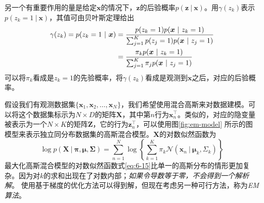 \documentclass[11pt]{ctexbook}
\begin{document}
另一个有重要作用的量是给定$\bm x$的情况下，$\bm z$的后验概率$p(\bm z\ |\ \bm x)$。用$\gamma(z_k)$表示$p(z_k=1\ |\ \bm x)$，其值可由贝叶斯定理给出
\begin{align}
	\gamma(z_k) = p(z_k=1\ |\ \bm x) &= \frac{p(z_k=1)p(\bm x\ |\ z_k=1)}{\sum_{j=1}^{K}p(z_j=1)p(\bm x\ |\ z_j=1)} \notag \\
									 &= \frac{\pi_k p(\bm x\ |\ z_k=1)}{\sum_{j=1}^{K}\pi_j p(\bm x\ |\ z_j=1)} 
\end{align}
可以将$\pi_k$看成是$z_k=1$的先验概率，将$\gamma(z_k)$看成是观测到$\bm x$之后，对应的后验概率。

假设我们有观测数据集$\{\bm x_1, \bm x_2, \ldots, \bm x_N\}$，我们希望使用混合高斯来对数据建模。可以将这个数据集标示为$N\times D$的矩阵$\bm X$，其中第$n$行为$\bm x_n^\top$。类似的，对应的隐变量被表示为一个$N\times K$的矩阵$\bm Z$，它的行为$\bm z_n^\top$，可以使用图\ref{fig:em-model} 所示的图模型来表示独立同分布数据集的高斯混合模型。$\bm X$的对数似然函数为
\begin{equation}
	\label{eq:6-15}
	\log p(\bm X\ |\ \bm \pi, \bm \mu, \bm \Sigma)=\sum_{n=1}^{N}\log\left\{ \sum_{k=1}^{K}\pi_k\mathcal N(\bm x_n\ |\ \bm \mu_k, \Sigma_k) \right\}
\end{equation}
最大化高斯混合模型的对数似然函数式\ref{eq:6-15}比单一的高斯分布的情形更加复杂。因为对$k$的求和出现在了对数内部；\emph{如果令导数等于零，不会得到一个解析解}。
使用基于梯度的优化方法可以得到解，但现在考虑另一种可行方法，称为\emph{EM算法}。
\end{document}
